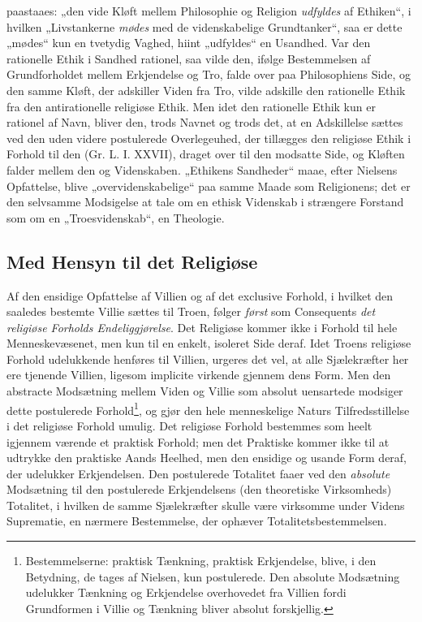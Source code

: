 \documentclass[12pt,a4paper]{book}
\newcommand{\opage}[1]{\marginnote{\footnotesize\textit{[#1]}}}
\begin{document}
paastaaes: „den vide Kløft mellem Philosophie og Religion \emph{udfyldes} af Ethiken“, i hvilken
„Livstankerne \emph{mødes} med de videnskabelige Grundtanker“, saa er dette „mødes“ kun en tvetydig
Vaghed, hiint „udfyldes“ en Usandhed. Var den rationelle Ethik i Sandhed rationel, saa vilde
den, ifølge \opage{199}Bestemmelsen af Grundforholdet mellem Erkjendelse og Tro, falde over paa
Philosophiens Side, og den samme Kløft, der adskiller Viden fra Tro, vilde adskille den
rationelle Ethik fra den antirationelle religiøse Ethik. Men idet den rationelle Ethik kun er
rationel af Navn, bliver den, trods Navnet og trods det, at en Adskillelse sættes ved den uden
videre postulerede Overlegeuhed, der tillægges den religiøse Ethik i Forhold til den (Gr. L.
I. XXVII), draget over til den modsatte Side, og Kløften falder mellem den og Videnskaben.
„Ethikens Sandheder“ maae, efter Nielsens Opfattelse, blive „overvidenskabelige“ paa samme
Maade som Religionens; det er den selvsamme Modsigelse at tale om en ethisk Videnskab i
strængere Forstand som om en „Troesvidenskab“, en Theologie.

\subsection{Med Hensyn til det Religiøse}
\label{ssec:conseq-religioes}

Af den ensidige Opfattelse af Villien og af det exclusive Forhold, i hvilket den saaledes
bestemte Villie sættes til Troen, følger \emph{først} som Consequents \emph{det religiøse Forholds
Endeliggjørelse}. Det Religiøse kommer ikke i Forhold til hele Menneskevæsenet, men kun til en
enkelt, isoleret Side deraf. Idet Troens religiøse Forhold udelukkende henføres til Villien,
urgeres det vel, at alle Sjælekræfter her ere tjenende Villien, ligesom implicite virkende
gjennem dens Form. Men den abstracte Modsætning mellem Viden og Villie som absolut uensartede
modsiger dette postulerede Forhold\footnote{Bestemmelserne: praktisk Tænkning, praktisk
Erkjendelse, blive, i den Betydning, de tages af Nielsen, kun postulerede. Den absolute
Modsætning udelukker Tænkning og Erkjendelse overhovedet fra Villien fordi Grundformen i Villie
og Tænkning bliver absolut forskjellig.}, og gjør den hele menneskelige Naturs Tilfredsstillelse
i det religiøse Forhold umulig. Det religiøse Forhold bestemmes som heelt igjennem værende et
praktisk \opage{200}Forhold; men det Praktiske kommer ikke til at udtrykke den praktiske Aands Heelhed, men
den ensidige og usande Form deraf, der udelukker Erkjendelsen. Den postulerede Totalitet faaer
ved den \emph{absolute} Modsætning til den postulerede Erkjendelsens (den theoretiske
Virksomheds) Totalitet, i hvilken de samme Sjælekræfter skulle være virksomme under Videns
Suprematie, en nærmere Bestemmelse, der ophæver Totalitetsbestemmelsen.
\end{document}
